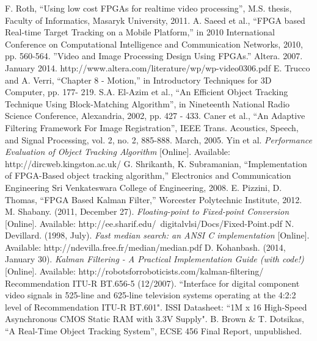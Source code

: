 \documentclass[11pt]{article} %
\begin{document}
\begin{thebibliography}{11}
F. Roth, “Using low cost FPGAs for realtime video processing”, M.S. thesis, Faculty of Informatics, Masaryk University, 2011.
A. Saeed et al., “FPGA based Real-time Target Tracking on a Mobile Platform,” in 2010 International Conference on Computational Intelligence and Communication Networks, 2010, pp. 560-564.
”Video and Image Processing Design Using FPGAs.” Altera. 2007. January 2014. 
http://www.altera.com/literature/wp/wp-video0306.pdf  
E. Trucco and A. Verri, “Chapter 8 - Motion,” in Introductory Techniques for 3D Computer, pp. 177- 219.
S.A. El-Azim et al., “An Efficient Object Tracking Technique Using Block-Matching Algorithm”, in Nineteenth National Radio Science Conference, Alexandria, 2002, pp. 427 - 433.
Caner et al., “An Adaptive Filtering Framework For Image Registration”, IEEE Trans. Acoustics, Speech, and Signal Processing, vol. 2, no. 2, 885-888. March, 2005. 
Yin et al. \textit{Performance Evaluation of Object Tracking Algorithm} [Online]. Available: http://dircweb.kingston.ac.uk/ 
G. Shrikanth, K. Subramanian, “Implementation of FPGA-Based object tracking algorithm,” Electronics and Communication Engineering Sri Venkateswara College of Engineering, 2008.
E. Pizzini, D. Thomas, “FPGA Based Kalman Filter,” Worcester Polytechnic Institute, 2012.
M. Shabany. (2011, December 27). \textit{Floating-point to Fixed-point Conversion} [Online]. Available: http://ee.sharif.edu/~digitalvlsi/Docs/Fixed-Point.pdf
N. Devillard. (1998, July). \textit{Fast median search: an ANSI C implementation} [Online]. Available: http://ndevilla.free.fr/median/median.pdf
D. Kohanbash. (2014, January 30). \textit{Kalman Filtering - A Practical Implementation Guide (with code!)} [Online]. Available: http://robotsforroboticists.com/kalman-filtering/
 Recommendation ITU-R BT.656-5 (12/2007). “Interface for digital component video signals in 525-line and 625-line television systems operating at the 4:2:2 level of Recommendation ITU-R BT.601". 
 ISSI Datasheet: “1M x 16 High-Speed Asynchronous CMOS Static RAM with 3.3V Supply".
 B. Brown \& T. Dotsikas, “A Real-Time Object Tracking System”, ECSE 456 Final Report, unpublished.
\end{thebibliography}
\newpage
\appendix
\appendixpage
\end{document}
